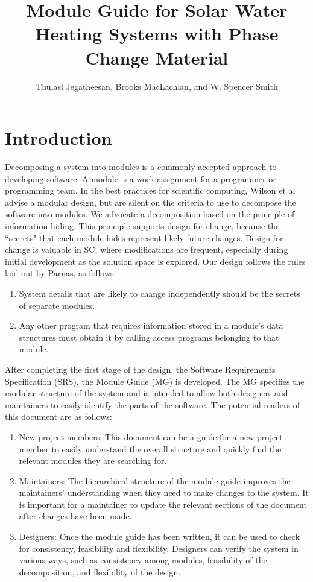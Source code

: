 \documentclass[12pt]{article}
\title{Module Guide for Solar Water Heating Systems with Phase Change Material}
\author{Thulasi Jegatheesan, Brooks MacLachlan, and W. Spencer Smith}
\begin{document}
\maketitle
\tableofcontents
\newpage
\section{Introduction}
\label{Sec:Intr}
Decomposing a system into modules is a commonly accepted approach to developing software.  A module is a work assignment for a programmer or programming team. In the best practices for scientific computing, Wilson et al advise a modular design, but are silent on the criteria to use to decompose the software into modules.  We advocate a decomposition based on the principle of information hiding. This principle supports design for change, because the ``secrets" that each module hides represent likely future changes.  Design for change is valuable in SC, where modifications are frequent, especially during initial development as the solution space is explored.
Our design follows the rules laid out by Parnas, as follows:
\begin{enumerate}
\item{System details that are likely to change independently should be the secrets of separate modules.}
\item{Any other program that requires information stored in a module's data structures must obtain it by calling access programs belonging to that module.}
\end{enumerate}
After completing the first stage of the design, the Software Requirements Specification (SRS), the Module Guide (MG) is developed. The MG specifies the modular structure of the system and is intended to allow both designers and maintainers to easily identify the parts of the software.  The potential readers of this document are as follows:
\begin{enumerate}
\item{New project members: This document can be a guide for a new project member to easily understand the overall structure and quickly find the relevant modules they are searching for.}
\item{Maintainers: The hierarchical structure of the module guide improves the maintainers' understanding when they need to make changes to the system. It is important for a maintainer to update the relevant sections of the document after changes have been made.}
\item{Designers: Once the module guide has been written, it can be used to check for consistency, feasibility and flexibility. Designers can verify the system in various ways, such as consistency among modules, feasibility of the decomposition, and flexibility of the design.}
\end{enumerate}
\end{document}
